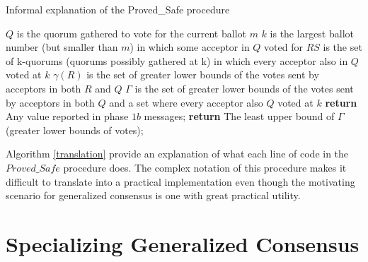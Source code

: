 \begin{algorithm}
	\caption{Informal explanation of the Proved\_Safe procedure}
	\label{translation}
	\begin{algorithmic}[1]
		\State $Q$ is the quorum gathered to vote for the current ballot $m$
		\State $k$ is the largest ballot number (but smaller than $m$) in which some acceptor in $Q$ voted for 
		\State $RS$ is the set of k-quorums (quorums possibly gathered at k) in which every acceptor also in $Q$ voted at $k$
		\State $\gamma(R)$ is the set of greater lower bounds of the votes sent by acceptors in both $R$ and $Q$
		\State $\Gamma$ is the set of greater lower bounds of the votes sent by acceptors in both $Q$ and a set where every acceptor also $Q$ voted at $k$
		\State \textbf{return} Any value reported in phase $1b$ messages;
		\Else
		\State \textbf{return} The least upper bound of $\Gamma$ (greater lower bounds of votes);
		\EndIf
		\EndFunction
		
	\end{algorithmic}
\end{algorithm}

Algorithm \ref{translation} provide an explanation of what each line of code in the $Proved\_Safe$ procedure does. The complex notation of this procedure makes it difficult to translate into a practical implementation even though the motivating scenario for generalized consensus is one with great practical utility. 

\section{Specializing Generalized Consensus}
